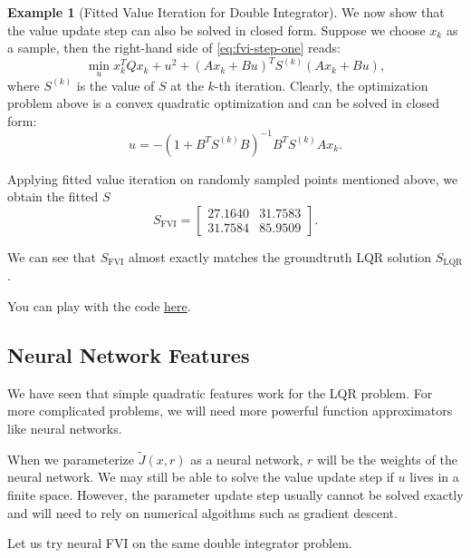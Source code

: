 \documentclass[
]{book}
\theoremstyle{definition}
\theoremstyle{definition}
\newtheorem{example}{Example}[chapter]
\theoremstyle{definition}
\theoremstyle{definition}
\theoremstyle{remark}
\begin{document}
\begin{example}[Fitted Value Iteration for Double Integrator]
We now show that the value update step can also be solved in closed form. Suppose we choose \(x_k\) as a sample, then the right-hand side of \eqref{eq:fvi-step-one} reads:
\[
\min_{u} x_k^T Q x_k + u^2 + (A x_k + B u)^T S^{(k)} (A x_k + B u),
\]
where \(S^{(k)}\) is the value of \(S\) at the \(k\)-th iteration. Clearly, the optimization problem above is a convex quadratic optimization and can be solved in closed form:
\[
u = - (1 + B^T S^{(k)} B) ^{-1} B^T S^{(k)} A x_k.
\]

Applying fitted value iteration on randomly sampled points mentioned above, we obtain the fitted \(S\)
\[
S_{\mathrm{FVI}} = \begin{bmatrix} 27.1640 & 31.7583 \\ 31.7584 & 85.9509 \end{bmatrix}.
\]

We can see that \(S_{\mathrm{FVI}}\) almost exactly matches the groundtruth LQR solution \(S_{\mathrm{LQR}}\).

You can play with the code \href{https://github.com/ComputationalRobotics/OptimalControlEstimation-Examples/blob/main/LQR_FVI_Example.m}{here}.

\end{example}

\hypertarget{neural-network-features}{%
\subsection{Neural Network Features}\label{neural-network-features}}

We have seen that simple quadratic features work for the LQR problem. For more complicated problems, we will need more powerful function approximators like neural networks.

When we parameterize \(\tilde{J}(x,r)\) as a neural network, \(r\) will be the weights of the neural network. We may still be able to solve the value update step if \(u\) lives in a finite space. However, the parameter update step usually cannot be solved exactly and will need to rely on numerical algoithms such as gradient descent.

Let us try neural FVI on the same double integrator problem.
\end{document}
